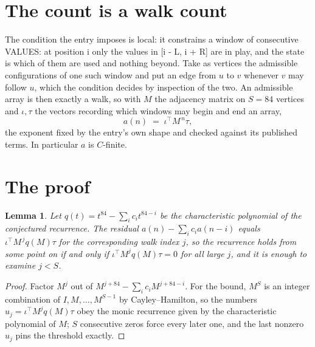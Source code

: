 \documentclass[11pt,a4paper]{article}
\theoremstyle{plain}
\newtheorem{lemma}[theorem]{Lemma}
\theoremstyle{definition}
\begin{document}
\section{The count is a walk count}

The condition the entry imposes is local: it constrains a window of consecutive VALUES: at position i only the values in [i - L, i + R] are in play, and the state is which of them are used and nothing beyond. Take as
vertices the admissible configurations of one such window and put an edge from $u$ to $v$
whenever $v$ may follow $u$, which the condition decides by inspection of the two. An
admissible array is then exactly a walk, so with $M$ the adjacency matrix on $S=84$ vertices
and $\iota,\tau$ the vectors recording which windows may begin and end an array,
\[
a(n)\;=\;\iota^{\!\top}M^{\,n}\tau ,
\]
the exponent fixed by the entry's own shape and checked against its published terms. In
particular $a$ is $C$-finite.

\section{The proof}

\begin{lemma}\label{lem:crit}
Let $q(t)=t^{84}-\sum_i c_it^{84-i}$ be the characteristic polynomial of the
conjectured recurrence. The residual $a(n)-\sum_ic_ia(n-i)$ equals
$\iota^{\!\top}M^{\,j}q(M)\tau$ for the corresponding walk index $j$, so the recurrence
holds from some point on if and only if $\iota^{\!\top}M^{j}q(M)\tau=0$ for all large $j$,
and it is enough to examine $j<S$.
\end{lemma}

\begin{proof}
Factor $M^{j}$ out of $M^{j+84}-\sum_ic_iM^{j+84-i}$. For the bound, $M^{S}$
is an integer combination of $I,M,\dots,M^{S-1}$ by Cayley--Hamilton, so the numbers
$u_j=\iota^{\!\top}M^{j}q(M)\tau$ obey the monic recurrence given by the characteristic
polynomial of $M$; $S$ consecutive zeros force every later one, and the last nonzero $u_j$
pins the threshold exactly.
\end{proof}
\end{document}
